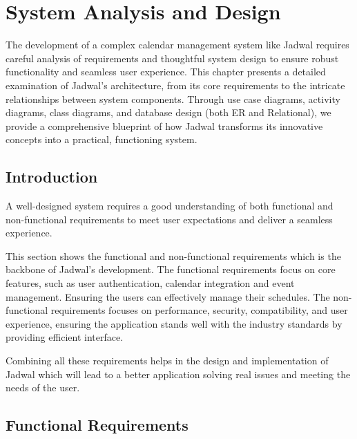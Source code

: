 \chapter{System Analysis and Design}

The development of a complex calendar management system like Jadwal requires careful analysis of requirements and thoughtful system design to ensure robust functionality and seamless user experience. This chapter presents a detailed examination of Jadwal's architecture, from its core requirements to the intricate relationships between system components. Through use case diagrams, activity diagrams, class diagrams, and database design (both ER and Relational), we provide a comprehensive blueprint of how Jadwal transforms its innovative concepts into a practical, functioning system.

\section{Introduction}

A well-designed system requires a good understanding of both functional and non-functional requirements to meet user expectations and deliver a seamless experience.

This section shows the functional and non-functional requirements which is the backbone of Jadwal's development. The functional requirements focus on core features, such as user authentication, calendar integration and event management. Ensuring the users can effectively manage their schedules. The non-functional requirements focuses on performance, security, compatibility, and user experience, ensuring the application stands well with the industry standards by providing efficient interface.

Combining all these requirements helps in the design and implementation of Jadwal which will lead to a better application solving real issues and meeting the needs of the user.

\section{Functional Requirements}

